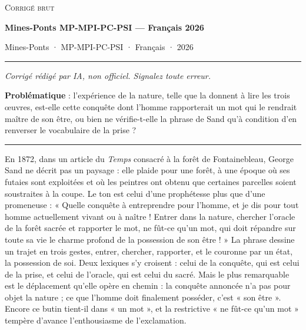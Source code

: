 \documentclass[11pt,a4paper]{article}
\begin{document}
\thispagestyle{plain}
\begin{center}
  {\small\scshape Corrigé brut}\par\smallskip
  {\LARGE\bfseries Mines-Ponts MP-MPI-PC-PSI — Français 2026\par}\medskip
  {\large Mines-Ponts · MP-MPI-PC-PSI · Français · 2026\par}
\end{center}
\vspace{2pt}\hrule\vspace{8pt}

\emph{Corrigé rédigé par IA, non officiel. Signalez toute erreur.}

\textbf{Problématique} : l'expérience de la nature, telle que la donnent à lire les trois œuvres, est-elle cette conquête dont l'homme rapporterait un mot qui le rendrait maître de son être, ou bien ne vérifie-t-elle la phrase de Sand qu'à condition d'en renverser le vocabulaire de la prise ?

\begin{center}\rule{0.5\linewidth}{0.5pt}\end{center}

En 1872, dans un article du \emph{Temps} consacré à la forêt de Fontainebleau, George Sand ne décrit pas un paysage : elle plaide pour une forêt, à une époque où ses futaies sont exploitées et où les peintres ont obtenu que certaines parcelles soient soustraites à la coupe. Le ton est celui d'une prophétesse plus que d'une promeneuse : « Quelle conquête à entreprendre pour l'homme, et je dis pour tout homme actuellement vivant ou à naître ! Entrer dans la nature, chercher l'oracle de la forêt sacrée et rapporter le mot, ne fût-ce qu'un mot, qui doit répandre sur toute sa vie le charme profond de la possession de son être ! » La phrase dessine un trajet en trois gestes, entrer, chercher, rapporter, et le couronne par un état, la possession de soi. Deux lexiques s'y croisent : celui de la conquête, qui est celui de la prise, et celui de l'oracle, qui est celui du sacré. Mais le plus remarquable est le déplacement qu'elle opère en chemin : la conquête annoncée n'a pas pour objet la nature ; ce que l'homme doit finalement posséder, c'est « son être ». Encore ce butin tient-il dans « un mot », et la restrictive « ne fût-ce qu'un mot » tempère d'avance l'enthousiasme de l'exclamation.
\end{document}
